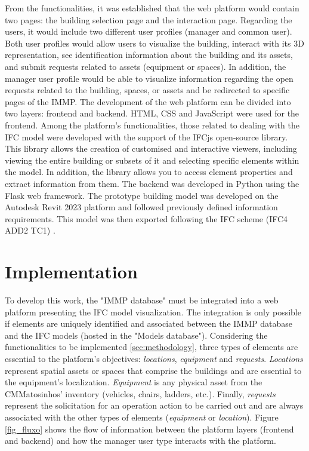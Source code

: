 \documentclass[a4paper, 10pt, twocolumn, twoside]{article}
\begin{document}
From the functionalities, it was established that the web platform would contain two pages: the building selection page and the interaction page. Regarding the users, it would include two different user profiles (manager and common user). Both user profiles would allow users to visualize the building, interact with its 3D representation, see identification information about the building and its assets, and submit requests related to assets (equipment or spaces). In addition, the manager user profile would be able to visualize information regarding the open requests related to the building, spaces, or assets and be redirected to specific pages of the IMMP. The development of the web platform can be divided into two layers: frontend and backend. HTML, CSS and JavaScript were used for the frontend. Among the platform's functionalities, those related to dealing with the IFC model were developed with the support of the IFCjs open-source library. This library allows the creation of customised and interactive viewers, including viewing the entire building or subsets of it and selecting specific elements within the model. In addition, the library allows you to access element properties and extract information from them. The backend was developed in Python using the Flask web framework. The prototype building model was developed on the Autodesk Revit 2023 platform and followed previously defined information requirements. This model was then exported following the IFC scheme (IFC4 ADD2 TC1) \cite{BuildingSMARTa}.

\section{Implementation}
\label{sec:implementation}

To develop this work, the "IMMP database" must be integrated into a web platform presenting the IFC model visualization. The integration is only possible if elements are uniquely identified and associated between the IMMP database and the IFC models (hosted in the "Models database"). Considering the functionalities to be implemented \ref{sec:methodology}, three types of elements are essential to the platform's objectives: \emph{locations}, \emph{equipment} and \emph{requests}. \emph{Locations} represent spatial assets or spaces that comprise the buildings and are essential to the equipment's localization. \emph{Equipment} is any physical asset from the CMMatosinhos' inventory (vehicles, chairs, ladders, etc.). Finally, \emph{requests} represent the solicitation for an operation action to be carried out and are always associated with the other types of elements (\emph{equipment} or \emph{location}). Figure \ref{fig_fluxo} shows the flow of information between the platform layers (frontend and backend) and how the manager user type interacts with the platform.
\end{document}
